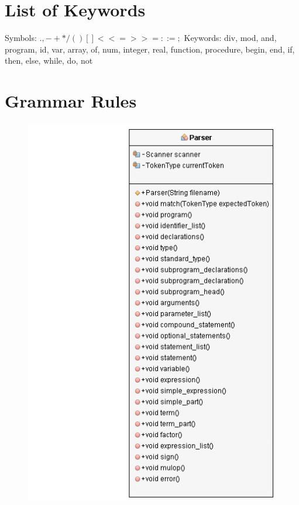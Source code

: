 \documentclass[10]{article}
\begin{document}
\newpage
\begin{appendices}



\section{List of Keywords}
\label{keywords}
Symbols: $ . , - + * / ( ) { } [ ] { } < <= > >= : := ;$  
\newline
Keywords: div, mod, and, program, id, var, array, of, num, integer, real, function, procedure, begin, end, if, then, else, while, do, not

\section{Grammar Rules}
\label{grammars}



\begin{figure}
	\includegraphics{ParserUML.png}
	\label{parserUML}
\end{figure}


\end{appendices}
\end{document}
